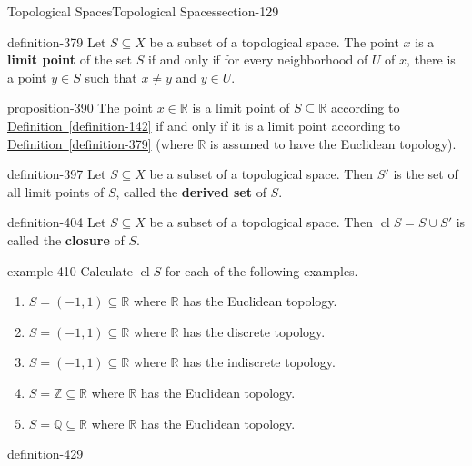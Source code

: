 \documentclass[oneside,10pt,]{article}
\newcommand{\terminology}[1]{\textbf{#1}}
\newcommand{\mb}{\mathbb}
\newcommand{\cl}{\operatorname{cl}}
\begin{document}
\begin{sectionptx}{Topological Spaces}{}{Topological Spaces}{}{}{section-129}
\begin{definition}{}{definition-379}%
\hypertarget{p-380}{}%
Let \(S\subseteq X\) be a subset of a topological space. The point \(x\) is a \terminology{limit point} of the set \(S\) if and only if for every neighborhood of \(U\) of \(x\), there is a point \(y\in S\) such that \(x\not=y\) and \(y\in U\).%
\end{definition}
\begin{proposition}{}{}{proposition-390}%
\hypertarget{p-391}{}%
The point \(x\in\mb R\) is a limit point of \(S\subseteq \mb R\) according to \hyperref[definition-142]{Definition~\ref{definition-142}} if and only if it is a limit point according to \hyperref[definition-379]{Definition~\ref{definition-379}} (where \(\mb R\) is assumed to have the Euclidean topology).%
\end{proposition}
\begin{definition}{}{definition-397}%
\hypertarget{p-398}{}%
Let \(S\subseteq X\) be a subset of a topological space. Then \(S'\) is the set of all limit points of \(S\), called the \terminology{derived set} of \(S\).%
\end{definition}
\begin{definition}{}{definition-404}%
\hypertarget{p-405}{}%
Let \(S\subseteq X\) be a subset of a topological space. Then \(\cl S=S\cup S'\) is called the \terminology{closure} of \(S\).%
\end{definition}
\begin{example}{}{example-410}%
\hypertarget{p-411}{}%
Calculate \(\cl S\) for each of the following examples.%
\leavevmode%
\begin{enumerate}
\item\hypertarget{li-414}{}\(S=(-1,1)\subseteq\mb R\) where \(\mb R\) has the Euclidean topology.%
\item\hypertarget{li-417}{}\(S=(-1,1)\subseteq\mb R\) where \(\mb R\) has the discrete topology.%
\item\hypertarget{li-420}{}\(S=(-1,1)\subseteq\mb R\) where \(\mb R\) has the indiscrete topology.%
\item\hypertarget{li-423}{}\(S=\mb Z\subseteq\mb R\) where \(\mb R\) has the Euclidean topology.%
\item\hypertarget{li-426}{}\(S=\mb Q\subseteq\mb R\) where \(\mb R\) has the Euclidean topology.%
\end{enumerate}
\end{example}
\begin{definition}{}{definition-429}%
\hypertarget{p-430}{}%

\end{definition}
\end{sectionptx}
\end{document}
